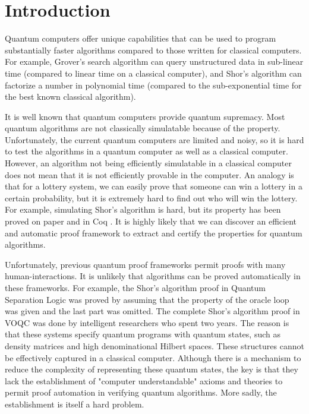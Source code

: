 \section{Introduction}
\label{sec:intro}


Quantum computers offer unique capabilities that can be used to
program substantially faster algorithms compared to those written for
classical computers. For example, Grover's search algorithm \cite{grover1996,grover1997}
can query unstructured data in sub-linear time (compared to linear
time on a classical computer), and Shor's algorithm \cite{shors} can factorize a
number in polynomial time (compared to the sub-exponential time for the
best known classical algorithm).

It is well known that quantum computers provide quantum supremacy.
Most quantum algorithms are not classically simulatable because of the property.
Unfortunately, the current quantum computers are limited and noisy, 
so it is hard to test the algorithms in a quantum computer as well as a classical computer.
However, an algorithm not being efficiently simulatable in a classical computer does not mean
that it is not efficiently provable in the computer.
An analogy is that for a lottery system, we can easily prove that someone can win a lottery in a certain probability,
but it is extremely hard to find out who will win the lottery.
For example, simulating Shor's algorithm \cite{ddsim} is hard, but its property has been proved
on paper and in Coq \cite{shorsprove}.
It is highly likely that we can discover an efficient and automatic proof framework
to extract and certify the properties for quantum algorithms.

Unfortunately, previous quantum proof frameworks \cite{qhoare, quantumseparation, VOQC, qbricks}
permit proofs with many human-interactions.
It is unlikely that algorithms can be proved automatically in these frameworks.
For example, the Shor's algorithm proof in Quantum Separation Logic \cite{quantumseparation}
was proved by assuming that the property of the oracle loop was given and the last part was omitted.
The complete Shor's algorithm proof in VOQC \cite{VOQC} 
was done by intelligent researchers who spent two years.
The reason is that these systems specify quantum programs with quantum states, 
such as density matrices and high denominational Hilbert spaces.
These structures cannot be effectively captured in a classical computer.
Although there is a mechanism \cite{10.1145/3453483.3454061}
to reduce the complexity of representing these quantum states,
the key is that they lack the establishment of "computer understandable" axioms and theories to permit
proof automation in verifying quantum algorithms.
More sadly, the establishment is itself a hard problem.

